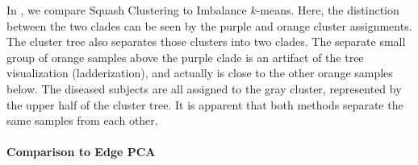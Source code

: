 In , we compare Squash Clustering to Imbalance $k$-means.
Here, the distinction between the two  clades
can be seen by the purple and orange cluster assignments.
The cluster tree also separates those clusters into two clades.
The separate small group of orange samples above the purple clade is an artifact of the tree visualization (ladderization),
and actually is close to the other orange samples below.
The diseased subjects are all assigned to the gray cluster, represented by the upper half of the cluster tree.
It is apparent that both methods separate the same samples from each other.


\paragraph{Comparison to Edge PCA}
\label{ch:Clustering:sec:Results:sub:BVDataset:par:EdgePCA}


